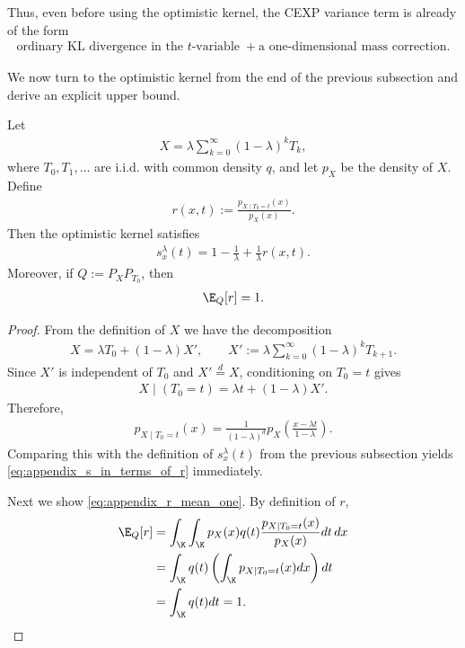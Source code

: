 Thus, even before using the optimistic kernel, the CEXP variance term is already of the form
\begin{align*}
    \text{ordinary KL divergence in the $t$-variable}
    \;+
    \text{a one-dimensional mass correction}.
\end{align*}

We now turn to the optimistic kernel from the end of the previous subsection and derive an explicit upper bound.

\begin{proposition}
\label{prop:appendix_optimistic_kernel_identity}
Let
\begin{align*}
    X = \lambda\sum_{k=0}^\infty (1-\lambda)^k T_k,
\end{align*}
where $T_0,T_1,\dots$ are i.i.d. with common density $q$, and let $p_X$ be the density of $X$.
Define
\begin{align}
    r(x,t) := \frac{p_{X\mid T_0=t}(x)}{p_X(x)}.
    \label{eq:appendix_r_def}
\end{align}
Then the optimistic kernel satisfies
\begin{align}
    s_x^\lambda(t)
    = 1 - \frac{1}{\lambda} + \frac{1}{\lambda}r(x,t).
    \label{eq:appendix_s_in_terms_of_r}
\end{align}
Moreover, if $Q := P_X P_{T_0}$, then
\begin{align}
    \E_Q[r] = 1.
    \label{eq:appendix_r_mean_one}
\end{align}
\end{proposition}

\begin{proof}
From the definition of $X$ we have the decomposition
\begin{align*}
    X
    = \lambda T_0 + (1-\lambda)X',
    \qquad
    X' := \lambda\sum_{k=0}^\infty (1-\lambda)^k T_{k+1}.
\end{align*}
Since $X'$ is independent of $T_0$ and $X' \stackrel{d}{=} X$, conditioning on $T_0=t$ gives
\begin{align*}
    X\mid(T_0=t) = \lambda t + (1-\lambda)X'.
\end{align*}
Therefore,
\begin{align}
    p_{X\mid T_0=t}(x)
    = \frac{1}{(1-\lambda)^d}
    p_X\left(\frac{x-\lambda t}{1-\lambda}\right).
    \label{eq:appendix_conditional_density}
\end{align}
Comparing this with the definition of $s_x^\lambda(t)$ from the previous subsection yields
\eqref{eq:appendix_s_in_terms_of_r} immediately.

Next we show \eqref{eq:appendix_r_mean_one}. By definition of $r$,
\begin{align*}
    \E_Q[r]
     & = \int_\K\int_\K p_X(x)q(t)\frac{p_{X\mid T_0=t}(x)}{p_X(x)}dt\,dx \\
     & = \int_\K q(t)\left(\int_\K p_{X\mid T_0=t}(x)dx\right)dt \\
     & = \int_\K q(t)dt
    = 1.
\end{align*}
\end{proof}

